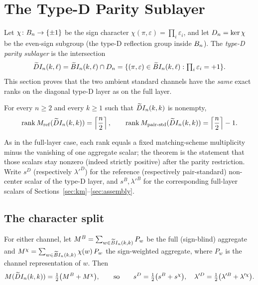 \section{The Type-D Parity Sublayer}\label{sec:typed}

Let $\chi\colon B_n\to\{\pm1\}$ be the sign character $\chi(\pi,\varepsilon)=\prod_{i}\varepsilon_i$, and let
$D_n=\ker\chi$ be the even-sign subgroup (the type-D reflection group inside $B_n$).  The \emph{type-D parity
sublayer} is the intersection
\[
  \widetilde{D}I_n(k,\ell)=\widetilde{B}I_n(k,\ell)\cap D_n
  =\{(\pi,\varepsilon)\in\widetilde{B}I_n(k,\ell): \textstyle\prod_i\varepsilon_i=+1\}.
\]
This section proves that the two ambient standard channels have the \emph{same} exact ranks on the diagonal type-D
layer as on the full layer.

\begin{theorem}\label{thm:typed}
For every $n\ge2$ and every $k\ge1$ such that $\widetilde{D}I_n(k,k)$ is nonempty,
\[
  \operatorname{rank} M_{\mathrm{ref}}(\widetilde{D}I_n(k,k))=\left\lceil\frac n2\right\rceil,
  \qquad
  \operatorname{rank} M_{\mathrm{pair\text{-}std}}(\widetilde{D}I_n(k,k))=\left\lceil\frac n2\right\rceil-1.
\]
\end{theorem}

As in the full-layer case, each rank equals a fixed matching-scheme multiplicity minus the vanishing of one aggregate
scalar; the theorem is the statement that those scalars stay nonzero (indeed strictly positive) after the parity
restriction.  Write $s^{D}$ (respectively $\lambda'^{D}$) for the reference (respectively pair-standard) non-center
scalar of the type-D layer, and $s^{B},\lambda'^{B}$ for the corresponding full-layer scalars of
Sections~\ref{sec:km}--\ref{sec:assembly}.

\subsection{The character split}

\begin{lemma}\label{lem:charsplit}
For either channel, let $M^{B}=\sum_{w\in\widetilde{B}I_n(k,k)}P_w$ be the full (sign-blind) aggregate and
$M^{\chi}=\sum_{w\in\widetilde{B}I_n(k,k)}\chi(w)\,P_w$ the sign-weighted aggregate, where $P_w$ is the channel
representation of $w$.  Then
\[
  M(\widetilde{D}I_n(k,k))=\tfrac12\bigl(M^{B}+M^{\chi}\bigr),
  \qquad\text{so}\qquad
  s^{D}=\tfrac12\bigl(s^{B}+s^{\chi}\bigr),\quad \lambda'^{D}=\tfrac12\bigl(\lambda'^{B}+\lambda'^{\chi}\bigr).
\]
\end{lemma}

